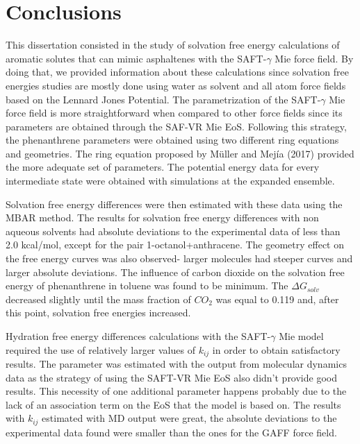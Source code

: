 \chapter{Conclusions} %

\label{Chapter6} %

This dissertation consisted in  the study of solvation free
energy calculations of aromatic solutes that can mimic asphaltenes with the SAFT-$\gamma$ 
Mie force field. By doing that, we provided information about these calculations since solvation free energies studies are mostly done using  water as solvent and all atom force fields based on the Lennard Jones Potential. The parametrization of the SAFT-$\gamma$  Mie force field is more straightforward
when compared to other force fields since its parameters are obtained through the SAF-VR
Mie EoS. Following this strategy, the phenanthrene parameters were obtained using two
different ring equations and geometries. The ring equation proposed by Müller and Mejía
(2017) provided the more adequate set of parameters.
The potential energy data for every intermediate state were obtained with simulations at the expanded ensemble. 

Solvation free energy differences were then
estimated with these data using the MBAR method. The results for solvation free energy differences with non aqueous solvents had absolute deviations to the experimental
data of less than 2.0 kcal/mol, except for the pair 1-octanol+anthracene. The geometry
effect on the free energy curves was also observed- larger molecules had steeper curves
and larger absolute deviations. The influence of carbon dioxide on the solvation free
energy of phenanthrene in toluene was found to be minimum. The $\Delta G_{solv}$ decreased slightly until the mass fraction of $CO_{2}$ was equal to 0.119 and, after this point, solvation free
energies increased. 

Hydration free energy differences calculations with the SAFT-$\gamma$ Mie model
required the use of relatively larger values of $k_{ij}$ in order to obtain satisfactory results.
The parameter was estimated with the output from molecular dynamics data as
the strategy of using the SAFT-VR Mie EoS also didn’t provide good results. This
necessity of one additional parameter happens probably due to the lack of an association term
on the EoS that the model is based on. The results with $k_{ij}$ estimated with MD output
were great, the absolute deviations to the experimental data found were smaller than
the ones for the GAFF force field.

